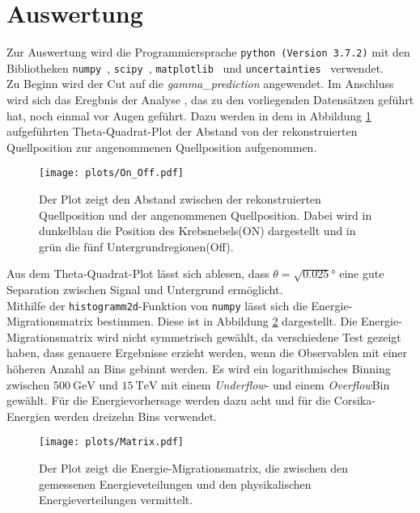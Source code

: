 \section{Auswertung}
Zur Auswertung wird die Programmiersprache \texttt{python (Version 3.7.2)} mit
den Bibliotheken \texttt{numpy}~\cite{numpy}, \texttt{scipy}~\cite{scipy},  \texttt{matplotlib}~\cite{matplotlib} und \texttt{uncertainties}~\cite{uncertainties} verwendet.\\
Zu Beginn wird der Cut auf die \textit{gamma\_prediction} angewendet. Im Anschluss wird sich das Eregbnis der Analyse \cite{FACTanalyse}, das zu den vorliegenden Datensätzen geführt hat, noch einmal vor Augen geführt. Dazu werden in dem in Abbildung \ref{fig:Theta2} aufgeführten Theta-Quadrat-Plot der Abstand von der rekonstruierten Quellposition zur angenommenen Quellposition aufgenommen. \\
\begin{figure}
  \centering
  \texttt{[image: plots/On\_Off.pdf]}
  \caption{Der Plot zeigt den Abstand zwischen der rekonstruierten Quellposition und der angenommenen Quellposition. Dabei wird in dunkelblau die Position des Krebsnebels(ON) dargestellt und in grün die fünf Untergrundregionen(Off).}
  \label{fig:Theta2}
\end{figure}
Aus dem Theta-Quadrat-Plot lässt sich ablesen, dass $\theta = \sqrt{0.025}\si{\degree}$ eine gute Separation zwischen Signal und Untergrund ermöglicht.\\
Mithilfe der \texttt{histogramm2d}-Funktion von \texttt{numpy} lässt sich die Energie-Migrationsmatrix bestimmen. Diese ist in Abbildung \ref{fig:mig} dargestellt. Die Energie-Migrationsmatrix wird nicht symmetrisch gewählt, da verschiedene Test gezeigt haben, dass genauere Ergebnisse erzieht werden, wenn die Observablen mit einer höheren Anzahl an Bins gebinnt werden. Es wird ein logarithmisches Binning zwischen $\SI{500}{\giga\electronvolt}$ und $\SI{15}{\tera\electronvolt}$ mit einem \textit{Underflow}- und einem \textit{Overflow}Bin gewählt. Für die Energievorhersage werden dazu acht und für die Corsika-Energien werden dreizehn Bins verwendet.\\
\begin{figure}
  \centering
  \texttt{[image: plots/Matrix.pdf]}
  \caption{Der Plot zeigt die Energie-Migrationsmatrix, die zwischen den gemessenen Energieveteilungen und den physikalischen Energieverteilungen vermittelt.}
  \label{fig:mig}
\end{figure}
